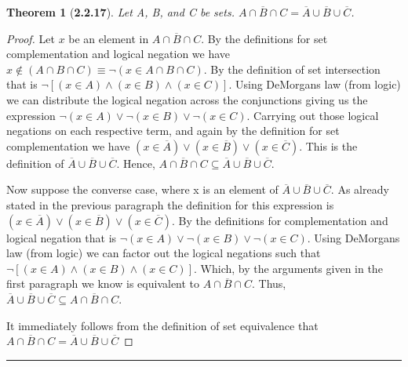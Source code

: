 \documentclass[a4paper, 12pt]{article}
\theoremstyle{plain}
\newtheorem*{theorem*}{Theorem}
\begin{document}
\pagebreak


\begin{theorem*}[\textbf{2.2.17}]
    Let A, B, and C be sets. 
    $\overline{A \cap B \cap C} = \overline{A} \cup \overline{B} \cup \overline {C}$.
\end{theorem*}

\begin{proof}
    Let $x$ be an element in $\overline{A \cap B \cap C}$. By the definitions for set 
    \newline complementation and logical negation we have \newline 
    $x \notin (A \cap B \cap C) \equiv \lnot (x \in A \cap B \cap C)$. By the definition of 
    set intersection that is $\lnot [(x \in A) \land (x \in B) \land (x \in C)]$. Using 
    DeMorgans law (from logic) we can distribute the logical negation across the conjunctions 
    giving us the expression $\lnot (x \in A) \lor \lnot (x \in B) \lor \lnot (x \in C)$. 
    Carrying out those logical negations on each respective term, and again by the definition 
    for set complementation we have 
    $(x \in \overline{A}) \lor (x \in \overline{B}) \lor (x \in \overline{C})$. This is the 
    definition of $\overline{A} \cup \overline{B} \cup \overline{C}$. Hence, 
    $\overline{A \cap B \cap C} \subseteq \overline{A} \cup \overline{B} \cup \overline{C}$.
    
    Now suppose the converse case, where x is an element of 
    $\overline{A} \cup \overline{B} \cup \overline{C}$. As already stated in the previous 
    paragraph the definition for this expression is 
    $(x \in \overline{A}) \lor (x \in \overline{B}) \lor (x \in \overline{C})$. By the 
    definitions for complementation and logical negation that is 
    $\lnot (x \in A) \lor \lnot (x \in B) \lor \lnot (x \in C)$. Using DeMorgans law 
    (from logic) we can factor out the logical negations such that 
    $\lnot [(x \in A) \land (x \in B) \land (x \in C)]$. Which, by the arguments given in the 
    first paragraph we know is equivalent to $\overline{A \cap B \cap C}$. Thus, 
    $\overline{A} \cup \overline{B} \cup \overline{C} \subseteq \overline{A \cap B \cap C}$.
    
    It immediately follows from the definition of set equivalence that \newline 
    $\overline{A \cap B \cap C} = \overline{A} \cup \overline{B} \cup \overline{C}$
\end{proof}
\begin{center}
    \rule{5.4in}{1pt}
\end{center}
\end{document}
